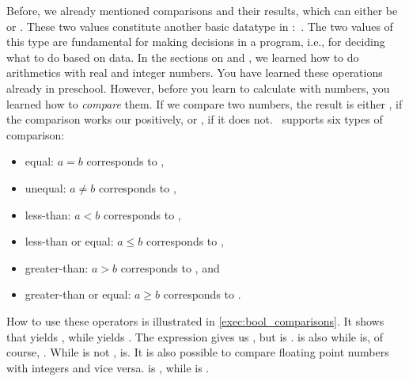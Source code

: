 %
\label{sec:bool}%
%
Before, we already mentioned comparisons and their results, which can either be  or .
These two values constitute another basic datatype in \python:~.
The two values of this type are fundamental for making decisions in a program, i.e., for deciding what to do based on data.%
%
%
%
%
%
%
In the sections on  and , we learned how to do arithmetics with real and integer numbers.
You have learned these operations already in preschool.
However, before you learn to calculate with numbers, you learned how to \emph{compare} them.
If we compare two numbers, the result is either , if the comparison works our positively, or , if it does not.
\python\ supports six types of comparison:%
%
\begin{itemize}%
%
\item equal: $a = b$ corresponds to \pythonIdx{==},%
\item unequal: $a \neq b$ corresponds to ,%
\item less-than: $a < b$ corresponds to \pythonIdx{<},%
\item less-than or equal: $a \leq b$ corresponds to \pythonIdx{<=},%
\item greater-than: $a > b$ corresponds to \pythonIdx{>}, and%
\item greater-than or equal: $a \geq b$ corresponds to \pythonIdx{>=}.%
%
\end{itemize}%
%
How to use these operators is illustrated in \cref{exec:bool_comparisons}.
It shows that \pythonIdx{==} yields , while  yields .
The expression \pythonIdx{>} gives us , but \pythonIdx{>=} is .
\pythonIdx{<} is also  while  is, of course, .
While \pythonIdx{>} is not , \pythonIdx{>} is.
It is also possible to compare floating point numbers with integers and vice versa.
\pythonIdx{==} is , while  is .

